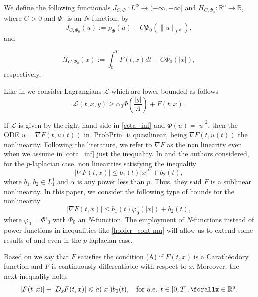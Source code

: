 \documentclass[twoside]{article}
\theoremstyle{remark}
\newcommand{\orlnor}{\|_{L^{\Phi}}}
\newcommand{\lphi}{L^{\Phi}}
\newcommand{\rr}{\mathbb{R}}
\renewcommand{\leq}{\leqslant}
\renewcommand{\geq}{\geqslant}
\begin{document}
We define the following  functionals $J_{C,\Phi_0}:\lphi\to (-\infty,+\infty]$ and $  H_{C,\Phi_0}:\rr^n\to \rr$, where $C>0$ and $\Phi_0$ is an $N$-function, by
\begin{equation}\label{func_phi}
  J_{C,\Phi_0}(u):= \rho_{\Phi}\left(u\right)-C\Phi_0\left(\|u\orlnor\right),
\end{equation}
 and

\begin{equation}\label{eq:functional_H-bis}
 H_{C,\Phi_0}(x):=\int_0^TF(t,x)dt-C\Phi_0(|x|),
\end{equation}
respectively.











Like in \cite{ABGMS2015} we consider Lagrangians $\mathcal{L}$ which are lower bounded as follows 
\begin{equation}\label{cota_inf}
\mathcal{L}(t,x,y)\geq \alpha_0\Phi\left(\frac{|y|}{\Lambda}\right)+ F(t,x).
\end{equation}

If $\mathcal{L}$ is given by the right hand side in \eqref{cota_inf} and $\Phi(u)=|u|^2$, then the ODE $\ddot{u}=\nabla F(t,u(t))$ in \eqref{ProbPrin}  is quasilinear,  being  $\nabla F(t,u(t))$ the nonlinearity. Following the literature, we refer to $\nabla F$ as the non linearity even when we assume in \eqref{cota_inf} just the inequality. In \cite{tang1998periodic} and \cite{tang2010periodic} the authors considered, for the $p$-laplacian case, non linearities satisfying the inequality
\[ |\nabla F(t,x)|\leq b_1(t)|x|^{\alpha}+b_2(t),\]
where  $b_1,b_2 \in L^1_1$ and $\alpha$ is any power less than $p$. Thus, they said $F$ is a sublinear nonlinearity. In this paper, we consider the following type of bounds for the nonlinearity 
\begin{equation}\label{holder_cont-mu}
  \left| \nabla F(t,x) \right|\leq b_1(t)\varphi_0(|x|)+b_2(t),
\end{equation}
where $\varphi_0=\Phi'_0$ with $\Phi_0$ an $N$-function. The employment of  $N$-functions instead of power functions in  inequalities like  \eqref{holder_cont-mu}  will allow us to extend some results of   \cite{tang1998periodic} and \cite{tang2010periodic} even in the $p$-laplacian case.


Based on \cite{mawhin2010critical} we say that $F$ satisfies the condition (A) if  $F(t,x)$ is a Carath\'eo\-dory function and  $F$ is continuously differentiable with respect to $x$. Moreover, the next inequality holds
\begin{equation}\label{condA2}|F(t,x)|+ |D_{x}F(t,x)|\leq a(|x|)b_0(t),\quad\text{for a.e. }t\in [0,T], \forallx\in\rr^d.
\end{equation}
\end{document}
